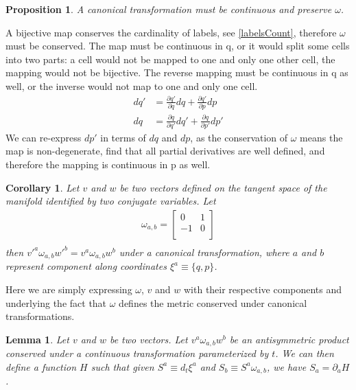 \documentclass[aps,pra,10pt,twocolumn,floatfix,nofootinbib]{revtex4-1}
\newtheorem{cor}[thm]{Corollary}
\newtheorem{lem}[thm]{Lemma}
\newtheorem{prop}[thm]{Proposition}
\theoremstyle{definition}
\begin{document}
\begin{prop}\label{continuousMapping}
A canonical transformation must be continuous and preserve $\omega$.
\end{prop}

A bijective map conserves the cardinality of labels, see \ref{labelsCount}, therefore $\omega$ must be conserved. The map must be continuous in q, or it would split some cells into two parts: a cell would not be mapped to one and only one other cell, the mapping would not be bijective. The reverse mapping must be continuous in q as well, or the inverse would not map to one and only one cell.
\begin{align*}
dq' &= \frac{\partial q'}{\partial q} dq + \frac{\partial q'}{\partial p} dp \\
dq &= \frac{\partial q}{\partial q'} dq' + \frac{\partial q}{\partial p'} dp'
\end{align*}
We can re-express $dp'$ in terms of $dq$ and $dp$, as the conservation of $\omega$ means the map is non-degenerate, find that all partial derivatives are well defined, and therefore the mapping is continuous in p as well.

\begin{cor}\label{sdofInvariant}
Let $v$ and $w$ be two vectors defined on the tangent space of the manifold identified by two conjugate variables. Let
\begin{align*}
\omega_{a, b} = \left[
  \begin{array}{cc}
    0 & 1 \\
    -1 & 0 \\
  \end{array}
\right] \\
\end{align*}
then $v'^{a} \omega_{a, b} w'^{b}=v^{a} \omega_{a, b} w^{b}$ under a canonical transformation, where $a$ and $b$ represent component along coordinates $\xi^{a} \equiv \{q,p\}$.
\end{cor}

Here we are simply expressing $\omega$, $v$ and $w$ with their respective components and underlying the fact that $\omega$ defines the metric conserved under canonical transformations.

\begin{lem}\label{genAntisim}
Let $v$ and $w$ be two vectors. Let $v^{a} \omega_{a, b} w^{b}$ be an antisymmetric product conserved under a continuous transformation parameterized by $t$. We can then define a function $H$ such that given $S^{a} \equiv d_{t}\xi^{a}$ and $S_{b} \equiv S^{a} \omega_{a, b}$, we have $S_{a} = \partial_{a}H$.
\end{lem}
\end{document}
